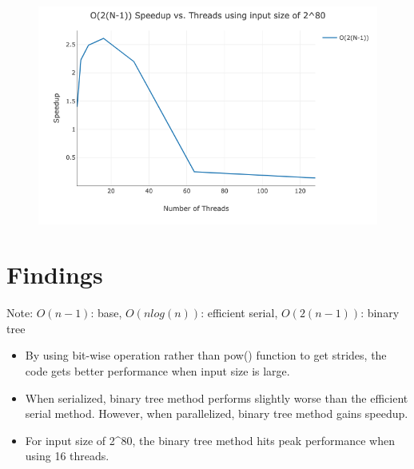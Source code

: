 \documentclass[a4paper,11pt,BCOR10mm,oneside,headsepline]{scrartcl}
\begin{document}
		\begin{figure}[!htbp]
			\centering
			\includegraphics[scale=0.44]{plot}
		\end{figure}

	\section{Findings}
	Note: \(O(n-1)\): base, \(O(nlog(n))\): efficient serial, \(O(2(n-1))\): binary tree
	\begin{itemize}
		\item By using bit-wise operation rather than pow() function to get strides, the code gets better performance when input size is large.
		\item When serialized, binary tree method performs slightly worse than the efficient serial method. However, when parallelized, binary tree method gains speedup.
		\item For input size of 2\textasciicircum{}80, the binary tree method hits peak performance when using 16 threads.
	\end{itemize}
\end{document}
